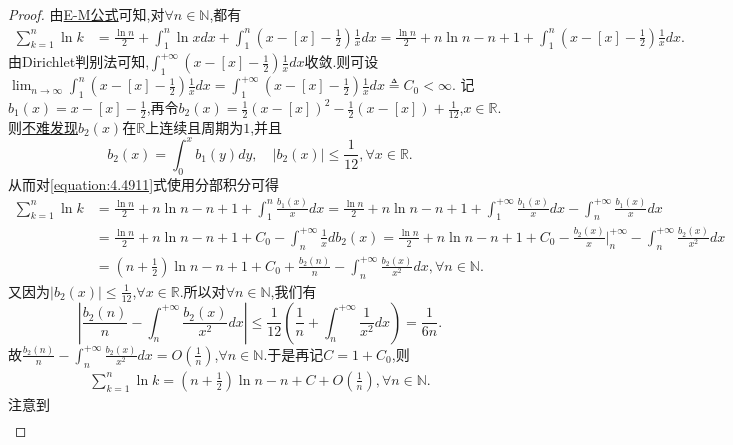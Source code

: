 \documentclass[../../main.tex]{subfiles}
\begin{document}
\begin{proof}
由\hyperref[proposition:0阶欧拉麦克劳林公式(0阶E-M公式)]{E-M公式}可知,对\(\forall n\in\mathbb{N}\),都有
\begin{align}\label{equation:4.4911}
\sum_{k = 1}^n\ln k&=\frac{\ln n}{2}+\int_1^n\ln xdx+\int_1^n\left(x - [x] - \frac{1}{2}\right)\frac{1}{x}dx
=\frac{\ln n}{2}+n\ln n - n + 1+\int_1^n\left(x - [x] - \frac{1}{2}\right)\frac{1}{x}dx.
\end{align}
由Dirichlet判别法可知,\(\int_1^{+\infty}\left(x - [x] - \frac{1}{2}\right)\frac{1}{x}dx\)收敛.则可设\(\lim_{n\rightarrow\infty}\int_1^n\left(x - [x] - \frac{1}{2}\right)\frac{1}{x}dx=\int_1^{+\infty}\left(x - [x] - \frac{1}{2}\right)\frac{1}{x}dx\triangleq C_0<\infty\).
记\(b_1(x)=x - [x] - \frac{1}{2}\),再令\(b_2(x)=\frac{1}{2}(x - [x])^2 - \frac{1}{2}(x - [x]) + \frac{1}{12}\),\(x\in\mathbb{R}\).则\hyperlink{b2性质}{不难发现}\(b_2(x)\)在\(\mathbb{R}\)上连续且周期为\(1\),并且
\[
b_2(x)=\int_0^x{b_1(y)dy}, \quad |b_2(x)|\leqslant\frac{1}{12}, \forall x\in\mathbb{R}.
\]
从而对\eqref{equation:4.4911}式使用分部积分可得
\begin{align*}
\sum_{k=1}^n{\ln k}&=\frac{\ln n}{2}+n\ln n-n+1+\int_1^n{\frac{b_1\left( x \right)}{x}dx}=\frac{\ln n}{2}+n\ln n-n+1+\int_1^{+\infty}{\frac{b_1\left( x \right)}{x}dx}-\int_n^{+\infty}{\frac{b_1\left( x \right)}{x}dx}
\\
&=\frac{\ln n}{2}+n\ln n-n+1+C_0-\int_n^{+\infty}{\frac{1}{x}db_2\left( x \right)}=\frac{\ln n}{2}+n\ln n-n+1+C_0-\frac{b_2\left( x \right)}{x}\Big|_{n}^{+\infty}-\int_n^{+\infty}{\frac{b_2\left( x \right)}{x^2}dx}
\\
&=\left( n+\frac{1}{2} \right) \ln n-n+1+C_0+\frac{b_2\left( n \right)}{n}-\int_n^{+\infty}{\frac{b_2\left( x \right)}{x^2}dx},\forall n\in\mathbb{N}.
\end{align*}
又因为\(|b_2(x)|\leqslant\frac{1}{12}\),\(\forall x\in\mathbb{R}\).所以对\(\forall n\in\mathbb{N}\),我们有
\[
\left|\frac{b_2(n)}{n} - \int_n^{+\infty}\frac{b_2(x)}{x^2}dx\right|\leqslant\frac{1}{12}\left(\frac{1}{n}+\int_n^{+\infty}\frac{1}{x^2}dx\right)=\frac{1}{6n}.
\]
故\(\frac{b_2(n)}{n} - \int_n^{+\infty}\frac{b_2(x)}{x^2}dx = O\left(\frac{1}{n}\right)\),\(\forall n\in\mathbb{N}\).于是再记\(C = 1 + C_0\),则
\begin{align}\label{equation:4491}
\sum_{k = 1}^n\ln k=\left(n + \frac{1}{2}\right)\ln n - n + C + O\left(\frac{1}{n}\right),\forall n\in\mathbb{N} .
\end{align}
注意到
\begin{align}\label{equation:4492}

\end{align}
\end{proof}
\end{document}
